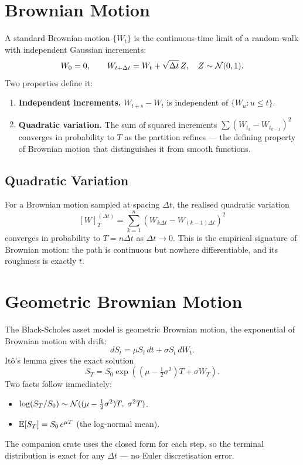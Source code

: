 \section{Brownian Motion}


A standard Brownian motion $\{W_t\}$ is the continuous-time limit of a random
walk with independent Gaussian increments:
\[
W_0 = 0, \qquad W_{t+\Delta t} = W_t + \sqrt{\Delta t} \, Z, \quad
Z \sim \mathcal{N}(0, 1).
\]
Two properties define it:
\begin{enumerate}
    \item \textbf{Independent increments.} $W_{t+s} - W_t$ is independent of
      $\{W_u : u \leq t\}$.
    \item \textbf{Quadratic variation.} The sum of squared increments
      $\sum (W_{t_k} - W_{t_{k-1}})^2$ converges in probability to $T$ as
      the partition refines --- the defining property of Brownian motion that
      distinguishes it from smooth functions.
\end{enumerate}

\subsection{Quadratic Variation}

For a Brownian motion sampled at spacing $\Delta t$, the realised quadratic
variation
\[
[W]_T^{(\Delta t)} = \sum_{k=1}^{n} (W_{k \Delta t} - W_{(k-1)\Delta t})^2
\]
converges in probability to $T = n \Delta t$ as $\Delta t \to 0$. This is the
empirical signature of Brownian motion: the path is continuous but
nowhere differentiable, and its roughness is exactly $t$.

\section{Geometric Brownian Motion}


The Black-Scholes asset model is geometric Brownian motion, the exponential
of Brownian motion with drift:
\[
dS_t = \mu S_t \, dt + \sigma S_t \, dW_t.
\]
It\^o's lemma gives the exact solution
\[
S_T = S_0 \exp\!\left( \left(\mu - \tfrac{1}{2}\sigma^2\right) T + \sigma W_T \right).
\]
Two facts follow immediately:
\begin{itemize}
    \item $\log(S_T / S_0) \sim \mathcal{N}((\mu - \tfrac{1}{2}\sigma^2)T,\; \sigma^2 T)$.
    \item $\mathbb{E}[S_T] = S_0 \, e^{\mu T}$ (the log-normal mean).
\end{itemize}
The companion crate uses the closed form for each step, so the terminal
distribution is exact for any $\Delta t$ --- no Euler discretisation error.

